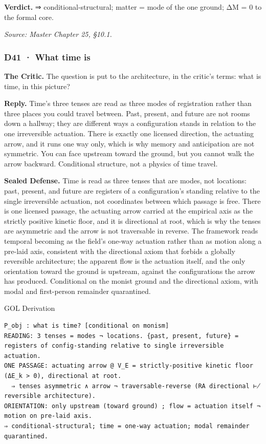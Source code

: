 \documentclass[10pt,twocolumn]{article}
\begin{document}
\textbf{Verdict.} ⇒ conditional-structural; matter = mode of the one
ground; ΔM = 0 to the formal core.

\emph{Source: Master Chapter 25, §10.1.}

\hypertarget{d41-what-time-is}{%
\subsubsection{D41 · What time is}\label{d41-what-time-is}}

\textbf{The Critic.} The question is put to the architecture, in the
critic's terms: what is time, in this picture?

\textbf{Reply.} Time's three tenses are read as three modes of
registration rather than three places you could travel between. Past,
present, and future are not rooms down a hallway; they are different
ways a configuration stands in relation to the one irreversible
actuation. There is exactly one licensed direction, the actuating arrow,
and it runs one way only, which is why memory and anticipation are not
symmetric. You can face upstream toward the ground, but you cannot walk
the arrow backward. Conditional structure, not a physics of time travel.

\textbf{Sealed Defense.} Time is read as three tenses that are modes,
not locations: past, present, and future are registers of a
configuration's standing relative to the single irreversible actuation,
not coordinates between which passage is free. There is one licensed
passage, the actuating arrow carried at the empirical axis as the
strictly positive kinetic floor, and it is directional at root, which is
why the tenses are asymmetric and the arrow is not traversable in
reverse. The framework reads temporal becoming as the field's one-way
actuation rather than as motion along a pre-laid axis, consistent with
the directional axiom that forbids a globally reversible architecture;
the apparent flow is the actuation itself, and the only orientation
toward the ground is upstream, against the configurations the arrow has
produced. Conditional on the monist ground and the directional axiom,
with modal and first-person remainder quarantined.

\begin{golbox}{GOL Derivation}
\begin{lstlisting}[style=golv]
P_obj : what is time? [conditional on monism]
READING: 3 tenses = modes ¬ locations. {past, present, future} = registers of config-standing relative to single irreversible actuation.
ONE PASSAGE: actuating arrow @ V_E = strictly-positive kinetic floor (ΔE_k > 0), directional at root.
  ⇒ tenses asymmetric ∧ arrow ¬ traversable-reverse (RA directional ⊬ reversible architecture).
ORIENTATION: only upstream (toward ground) ; flow = actuation itself ¬ motion on pre-laid axis.
⇒ conditional-structural; time = one-way actuation; modal remainder quarantined.
\end{lstlisting}
\end{golbox}
\end{document}
